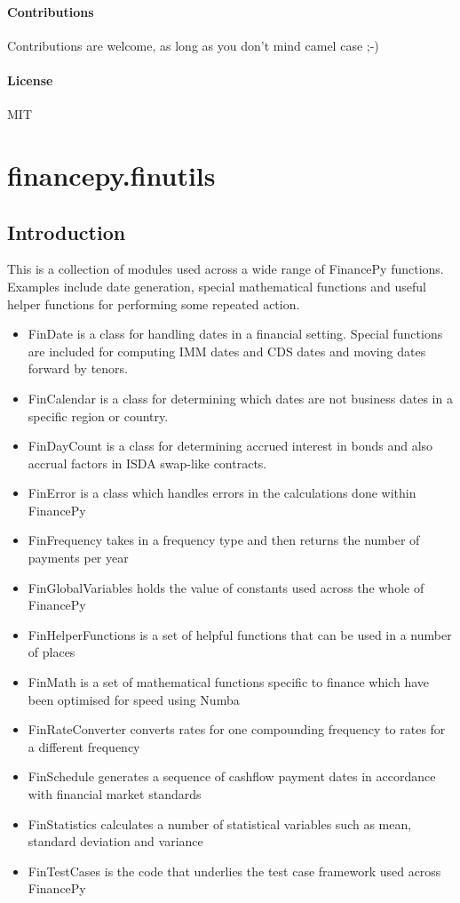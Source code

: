\documentclass[twoside,11pt]{book}
\begin{document}
\subsubsection*{Contributions}
Contributions are welcome, as long as you don't mind camel case ;-)


\subsubsection*{License}
MIT

\chapter{financepy.finutils}
\section{Introduction}

This is a collection of modules used across a wide range of FinancePy functions. Examples include date generation, special mathematical functions and useful helper functions for performing some repeated action.

\begin{itemize}
\item{ FinDate is a class for handling dates in a financial setting. Special functions are included for computing IMM dates and CDS dates and moving dates forward by tenors.
}
\item{ FinCalendar is a class for determining which dates are not business dates in a specific region or country.
}
\item{ FinDayCount is a class for determining accrued interest in bonds and also accrual factors in ISDA swap-like contracts.
}
\item{ FinError is a class which handles errors in the calculations done within FinancePy
}
\item{ FinFrequency takes in a frequency type and then returns the number of payments per year
}
\item{ FinGlobalVariables holds the value of constants used across the whole of FinancePy
}
\item{ FinHelperFunctions is a set of helpful functions that can be used in a number of places
}
\item{ FinMath is a set of mathematical functions specific to finance which have been optimised for speed using Numba
}
\item{ FinRateConverter converts rates for one compounding frequency to rates for a different frequency
}
\item{ FinSchedule generates a sequence of cashflow payment dates in accordance with financial market standards
}
\item{ FinStatistics calculates a number of statistical variables such as mean, standard deviation and variance
}
\item{ FinTestCases is the code that underlies the test case framework used across FinancePy
}
\end{itemize}
\end{document}
